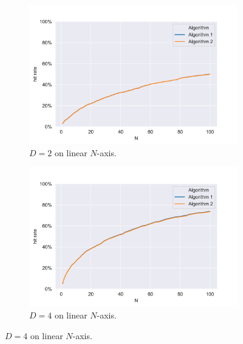 \documentclass[conference]{IEEEtran}
\begin{document}
\begin{figure}[htbp]
    \centering
    \begin{subfigure}{.48\textwidth}
        \centering
        \includegraphics[width=1\linewidth]{images/fb/hit_rates_d-2.png}
        \caption{$D=2$ on linear $N$-axis.}
        \label{fig:fb_hit_rates_d2}
    \end{subfigure}%

    \begin{subfigure}{.48\textwidth}
        \centering
        \includegraphics[width=1\linewidth]{images/fb/hit_rates_d-4.png}
        \caption{$D=4$ on linear $N$-axis.}
        \label{fig:fb_hit_rates_d4}
    \end{subfigure}%


\end{figure}
\end{document}

